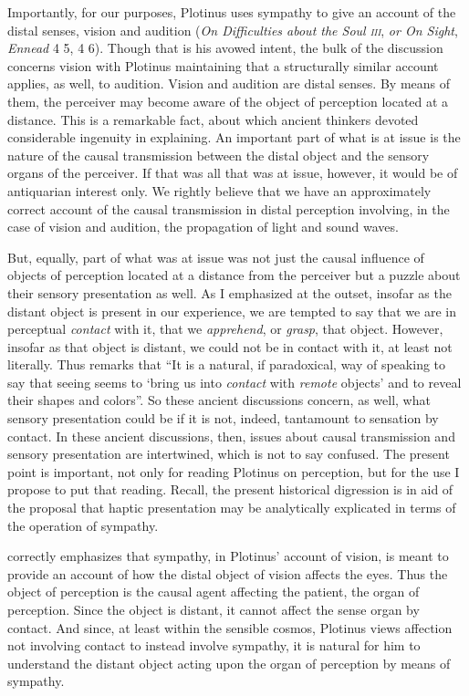Importantly, for our purposes, Plotinus uses sympathy to give an account of the distal senses, vision and audition (\emph{On Difficulties about the Soul \textsc{iii}}, \emph{or On Sight}, \emph{Ennead} 4 5, 4 6). Though that is his avowed intent, the bulk of the discussion concerns vision with Plotinus maintaining that a structurally similar account applies, as well, to audition. Vision and audition are distal senses. By means of them, the perceiver may become aware of the object of perception located at a distance. This is a remarkable fact, about which ancient thinkers devoted considerable ingenuity in explaining. An important part of what is at issue is the nature of the causal transmission between the distal object and the sensory organs of the perceiver. If that was all that was at issue, however, it would be of antiquarian interest only. We rightly believe that we have an approximately correct account of the causal transmission in distal perception involving, in the case of vision and audition, the propagation of light and sound waves. 

But, equally, part of what was at issue was not just the causal influence of objects of perception located at a distance from the perceiver but a puzzle about their sensory presentation as well. As I emphasized at the outset, insofar as the distant object is present in our experience, we are tempted to say that we are in perceptual \emph{contact} with it, that we \emph{apprehend}, or \emph{grasp}, that object. However, insofar as that object is distant, we could not be in contact with it, at least not literally. Thus \citet[33]{Broad:1965dq} remarks that ``It is a natural, if paradoxical, way of speaking to say that seeing seems to `bring us into \emph{contact} with \emph{remote} objects' and to reveal their shapes and colors''. So these ancient discussions concern, as well, what sensory presentation could be if it is not, indeed, tantamount to sensation by contact. In these ancient discussions, then, issues about causal transmission and sensory presentation are intertwined, which is not to say confused. The present point is important, not only for reading Plotinus on perception, but for the use I propose to put that reading. Recall, the present historical digression is in aid of the proposal that haptic presentation may be analytically explicated in terms of the operation of sympathy.

\citet[chapter 3]{Emilsson:1988uq} correctly emphasizes that sympathy, in Plotinus' account of vision, is meant to provide an account of how the distal object of vision affects the eyes. Thus the object of perception is the causal agent affecting the patient, the organ of perception. Since the object is distant, it cannot affect the sense organ by contact. And since, at least within the sensible cosmos, Plotinus views affection not involving contact to instead involve sympathy, it is natural for him to understand the distant object acting upon the organ of perception by means of sympathy. 

